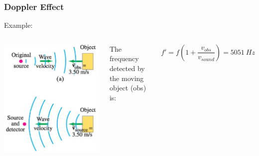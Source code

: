 \documentclass[]{beamer}
\begin{document}

\begin{frame}
\frametitle{Doppler Effect}

Example: 

\vspace{3mm}

   \begin{columns}[c]
   \column{2in}  %
  \begin{center}
  \includegraphics[height=2.in]{images4/doppler7.jpg}
\end{center}


  
   \column{2in}

   The frequency detected by the moving object (obs) is:

\begin{equation*}
f'= f\left(1+\frac{v_{obs}}{v_{sound}}\right)=5051~Hz
\end{equation*}




   \end{columns}




  \end{frame}


\end{document}
